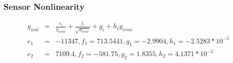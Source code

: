 \documentclass{beamer}
\begin{document}
\begin{frame}
\frametitle{Sensor Nonlinearity}
\begin{eqnarray*}
  y_{ical}&=& \frac{e_{i}}{y_{iraw}}+\frac{f_{i}}{\sqrt{y_{iraw}}}+g_{i}+h_{i}y_{iraw}\\
  e_{1} &=& -11347,f_{1}=713.5441,g_{1}=-2.9904,h_{1}=-2.5283*10^{-5} \\
  e_{2} &=& 7109.4,f_{2}=-581.75,g_{2}=1.8355,h_{2}=4.1371*10^{-5}
\end{eqnarray*}
\end{frame}


\end{document}
